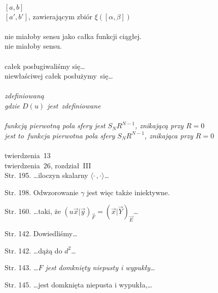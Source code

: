 \documentclass[a4paper,11pt]{article}
\numberwithin{equation}{section}
\begin{document}
 \\
\Jest $[ a, b ]$ \\
\PowinnoByc $[ a', b' ]$, zawierającym zbiór $\xi( [ \alpha, \beta ] )$ \\
 \\
\Jest nie miałoby sensu jako całka funkcji ciągłej. \\
\PowinnoByc nie miałoby sensu. \\
 \\
\Jest całek posługiwaliśmy się\ldots \\
\PowinnoByc niewłaściwej całek posłużymy~się\ldots \\
 \\
\Jest \textit{zdefiniowaną} \\
\PowinnoByc \textit{gdzie $D( u )$ jest~zdefiniowane} \\
 \\
\Jest \textit{funkcją pierwotną pola sfery jest $S_{ N } R^{ N - 1 }$,
  znikającą przy $R = 0$} \\
\PowinnoByc \textit{jest to~funkcja pierwotna pola sfery
  $S_{ N } R^{ N - 1 }$, znikająca przy $R = 0$} \\
 \\
\Jest twierdzenia~13 \\
\PowinnoByc twierdzenia~26, rozdział~III \\


















Str. 195. \ldots iloczyn skalarny
$\langle \cdot \,, \cdot \rangle$\ldots

Str. 198. Odwzorowanie $\gamma$ jest więc także iniektywne.

Str. 160. \ldots taki, że
$( u\vec{ x } | \vec{ y } )_{ \vec{ F } } = ( \vec{ x } | \vec{ Y }
)_{ \vec{ E } }$\ldots

Str. 142. Dowiedliśmy\ldots

Str. 142. \ldots dążą do $d^{ 2 }$\ldots

Str. 143. \textit{\ldots$F$ jest domknięty niepusty i
  wypukły\ldots}

Str. 145. \ldots jest domknięta niepusta i wypukła,\ldots
\end{document}
